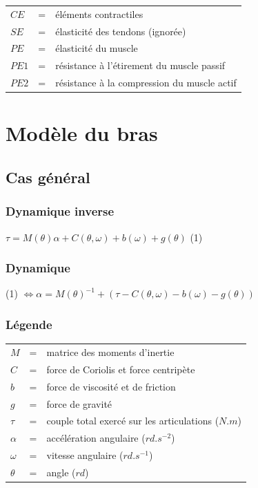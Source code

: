 \documentclass[pdftex,a4paper,11pt]{article}
\begin{document}
\begin{tabular}{lcl}
    $CE$  & = & éléments contractiles \\
    $SE$  & = & élasticité des tendons (ignorée) \\
    $PE$  & = & élasticité du muscle \\
    $PE1$ & = & résistance à l'étirement du muscle passif \\
    $PE2$ & = & résistance à la compression du muscle actif \\
\end{tabular}



\section{Modèle du bras}


\subsection{Cas général}

\subsubsection{Dynamique inverse}
$\tau = M(\theta)\alpha + C(\theta, \omega) + b(\omega) + g(\theta) $ (1)

\subsubsection{Dynamique}
(1) $\Leftrightarrow \alpha = M(\theta)^{-1} + (\tau - C(\theta, \omega) - b(\omega) - g(\theta)) $

\subsubsection{Légende}
\begin{tabular}{lcl}
    $M$      & = & matrice des moments d'inertie \\ %
    $C$      & = & force de Coriolis et force centripète \\
    $b$      & = & force de viscosité et de friction \\ %
    $g$      & = & force de gravité \\
    $\tau$   & = & couple total exercé sur les articulations ($N.m$) \\
    $\alpha$ & = & accélération angulaire ($rd.s^{-2}$) \\
    $\omega$ & = & vitesse angulaire ($rd.s^{-1}$) \\
    $\theta$ & = & angle ($rd$) \\
\end{tabular}
\end{document}
